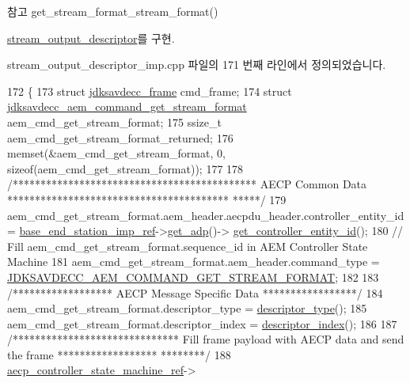 \begin{DoxySeeAlso}{참고}
get\+\_\+stream\+\_\+format\+\_\+stream\+\_\+format() 
\end{DoxySeeAlso}


\hyperlink{classavdecc__lib_1_1stream__output__descriptor_a4ba58b32ff7b9f5d961a0a5eb46d4c6c}{stream\+\_\+output\+\_\+descriptor}를 구현.



stream\+\_\+output\+\_\+descriptor\+\_\+imp.\+cpp 파일의 171 번째 라인에서 정의되었습니다.


\begin{DoxyCode}
172 \{
173     \textcolor{keyword}{struct }\hyperlink{structjdksavdecc__frame}{jdksavdecc\_frame} cmd\_frame;
174     \textcolor{keyword}{struct }\hyperlink{structjdksavdecc__aem__command__get__stream__format}{jdksavdecc\_aem\_command\_get\_stream\_format} 
      aem\_cmd\_get\_stream\_format;
175     ssize\_t aem\_cmd\_get\_stream\_format\_returned;
176     memset(&aem\_cmd\_get\_stream\_format, 0, \textcolor{keyword}{sizeof}(aem\_cmd\_get\_stream\_format));
177 
178     \textcolor{comment}{/******************************************** AECP Common Data ****************************************
      *****/}
179     aem\_cmd\_get\_stream\_format.aem\_header.aecpdu\_header.controller\_entity\_id = 
      \hyperlink{classavdecc__lib_1_1descriptor__base__imp_a550c969411f5f3b69f55cc139763d224}{base\_end\_station\_imp\_ref}->\hyperlink{classavdecc__lib_1_1end__station__imp_a471a74540ce6182fad0c17dfd010107e}{get\_adp}()->
      \hyperlink{classavdecc__lib_1_1adp_a0c0959a46658c0a22e9530334b2912da}{get\_controller\_entity\_id}();
180     \textcolor{comment}{// Fill aem\_cmd\_get\_stream\_format.sequence\_id in AEM Controller State Machine}
181     aem\_cmd\_get\_stream\_format.aem\_header.command\_type = 
      \hyperlink{group__command_ga44127c37d4df5fa78a40d28e053ac62c}{JDKSAVDECC\_AEM\_COMMAND\_GET\_STREAM\_FORMAT};
182 
183     \textcolor{comment}{/****************** AECP Message Specific Data *****************/}
184     aem\_cmd\_get\_stream\_format.descriptor\_type = \hyperlink{classavdecc__lib_1_1descriptor__base__imp_aefc543029ab093823c3f5b9d84f0ccc4}{descriptor\_type}();
185     aem\_cmd\_get\_stream\_format.descriptor\_index = \hyperlink{classavdecc__lib_1_1descriptor__base__imp_ac23c0a35276c07cfce8c8660700c2135}{descriptor\_index}();
186 
187     \textcolor{comment}{/****************************** Fill frame payload with AECP data and send the frame ******************
      ********/}
188     \hyperlink{namespaceavdecc__lib_a0b1b5aea3c0490f77cbfd9178af5be22}{aecp\_controller\_state\_machine\_ref}->

\end{DoxyCode}
